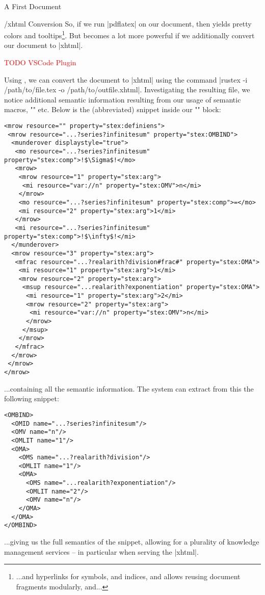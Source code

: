 \begin{sfragment}{A First \sTeX Document}
    \begin{sfragment}{\omdoc/xhtml Conversion}
      So, if we run |pdflatex| on our document, then \sTeX yields 
      pretty colors and
      tooltips\footnote{...and hyperlinks for symbols, and indices,
      and allows reusing document fragments modularly, and...}.
      But \sTeX becomes a lot more powerful if we additionally
      convert our document to |xhtml|.

      \textcolor{red}{TODO VSCode Plugin}

      Using \rustex, we can convert the document to |xhtml|
      using the command |rustex -i /path/to/file.tex -o /path/to/outfile.xhtml|.
      Investigating the resulting file, we notice additional semantic
      information resulting from our usage of semantic macros,
      \stexcode"\symref" etc. Below is the (abbreviated) snippet inside
      our \stexcode"" block:

      \begin{lstlisting}[escapechar=!]
<mrow resource="" property="stex:definiens">
 <mrow resource="...?series?infinitesum" property="stex:OMBIND">
  <munderover displaystyle="true">
   <mo resource="...?series?infinitesum" property="stex:comp">!$\Sigma$!</mo>
   <mrow>
    <mrow resource="1" property="stex:arg">
     <mi resource="var://n" property="stex:OMV">n</mi>
    </mrow>
    <mo resource="...?series?infinitesum" property="stex:comp">=</mo>
    <mi resource="2" property="stex:arg">1</mi>
   </mrow>
   <mi resource="...?series?infinitesum" property="stex:comp">!$\infty$!</mi>
  </munderover>
  <mrow resource="3" property="stex:arg">
   <mfrac resource="...?realarith?division#frac#" property="stex:OMA">
    <mi resource="1" property="stex:arg">1</mi>
    <mrow resource="2" property="stex:arg">
     <msup resource="...realarith?exponentiation" property="stex:OMA">
      <mi resource="1" property="stex:arg">2</mi>
      <mrow resource="2" property="stex:arg">
       <mi resource="var://n" property="stex:OMV">n</mi>
      </mrow>
     </msup>
    </mrow>
   </mfrac>
  </mrow>
 </mrow>
</mrow>
      \end{lstlisting}
      ...containing all the semantic information. The \mmt system
      can extract from this the following \openmath snippet:

      \begin{lstlisting}[escapechar=!]
<OMBIND>
  <OMID name="...?series?infinitesum"/>
  <OMV name="n"/>
  <OMLIT name="1"/>
  <OMA>
    <OMS name="...?realarith?division"/>
    <OMLIT name="1"/>
    <OMA>
      <OMS name="...realarith?exponentiation"/>
      <OMLIT name="2"/>
      <OMV name="n"/>
    </OMA>
  </OMA>
</OMBIND>
      \end{lstlisting}
      ...giving us the full semantics of the snippet, allowing for
      a plurality of knowledge management services -- in particular
      when serving the |xhtml|.


\end{sfragment}
\end{sfragment}
